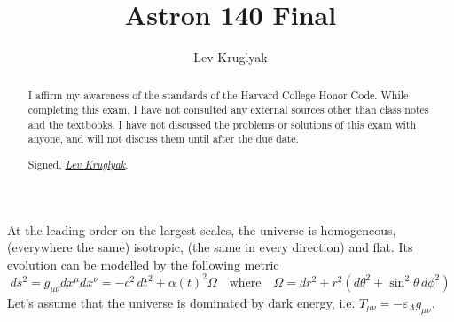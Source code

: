 \documentclass{../../templates/lkx_pset}
\title{Astron 140 Final}
\author{Lev Kruglyak}
\begin{document}
\maketitle

\begin{abstract}
I affirm my awareness of the standards of the Harvard College Honor Code. While completing this exam, I have not consulted any external sources other than class notes and the textbooks. I have not discussed the problems or solutions of this exam with anyone, and will not discuss them until after the due date.

\medskip
Signed, \underline{\textit{Lev Kruglyak}}.
\end{abstract}
\vspace{1em}

\begin{problem}{1}
\end{problem}

\begin{problem}{2}
  At the leading order on the largest scales, the universe is homogeneous, (everywhere the same) isotropic, (the same in every direction) and flat. Its evolution can be modelled by the following metric
  \[
    ds^2 = g_{\mu\nu} dx^\mu dx^\nu = -c^2\, dt^2 + \alpha(t)^2 \Omega \quad\textrm{where}\quad \Omega = dr^2 + r^2\left(d\theta^2 + \sin^2\theta\, d\phi^2\right)
  \]
  Let's assume that the universe is dominated by dark energy, i.e. $T_{\mu\nu} = -\varepsilon_\Lambda g_{\mu\nu}$.
\end{problem}
\end{document}
